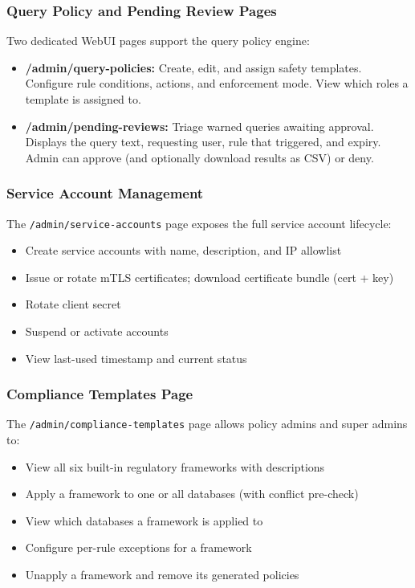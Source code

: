 \subsubsection{Query Policy and Pending Review Pages}

Two dedicated WebUI pages support the query policy engine:

\begin{itemize}[leftmargin=*]
    \item \textbf{/admin/query-policies:} Create, edit, and assign safety templates. Configure rule conditions, actions, and enforcement mode. View which roles a template is assigned to.
    \item \textbf{/admin/pending-reviews:} Triage warned queries awaiting approval. Displays the query text, requesting user, rule that triggered, and expiry. Admin can approve (and optionally download results as CSV) or deny.
\end{itemize}

\subsubsection{Service Account Management}

The \texttt{/admin/service-accounts} page exposes the full service account lifecycle:

\begin{itemize}[leftmargin=*]
    \item Create service accounts with name, description, and IP allowlist
    \item Issue or rotate mTLS certificates; download certificate bundle (cert + key)
    \item Rotate client secret
    \item Suspend or activate accounts
    \item View last-used timestamp and current status
\end{itemize}

\subsubsection{Compliance Templates Page}

The \texttt{/admin/compliance-templates} page allows policy admins and super admins to:

\begin{itemize}[leftmargin=*]
    \item View all six built-in regulatory frameworks with descriptions
    \item Apply a framework to one or all databases (with conflict pre-check)
    \item View which databases a framework is applied to
    \item Configure per-rule exceptions for a framework
    \item Unapply a framework and remove its generated policies
\end{itemize}

